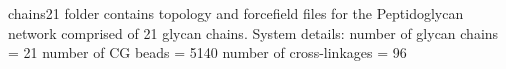 chains21 folder contains topology and forcefield files for the Peptidoglycan network comprised of 21 glycan chains.
System details:
number of glycan chains = 21 
number of CG beads = 5140
number of cross-linkages = 96
